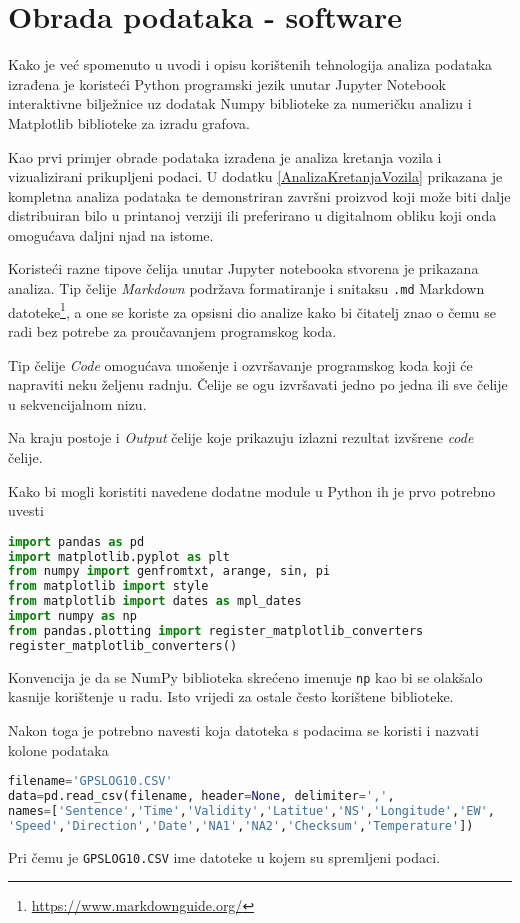 \chapter{Obrada podataka - software}\label{ch:Software}
Kako je već spomenuto u uvodi i opisu korištenih tehnologija analiza podataka izrađena je koristeći Python programski jezik unutar Jupyter Notebook interaktivne bilježnice uz dodatak Numpy biblioteke za numeričku analizu i Matplotlib biblioteke za izradu grafova.

Kao prvi primjer obrade podataka izrađena je analiza kretanja vozila i vizualizirani prikupljeni podaci.
U dodatku \ref{AnalizaKretanjaVozila} prikazana je kompletna analiza podataka te demonstriran završni proizvod koji može biti dalje distribuiran bilo u printanoj verziji ili preferirano u digitalnom obliku koji onda omogućava daljni njad na istome.

Koristeći razne tipove čelija unutar Jupyter notebooka stvorena je prikazana analiza.
Tip čelije \textit{Markdown} podržava formatiranje i snitaksu \texttt{.md} Markdown datoteke\footnote{\url{https://www.markdownguide.org/}}, a one se koriste za opsisni dio analize kako bi čitatelj znao o čemu se radi bez potrebe za proučavanjem programskog koda.

Tip čelije \textit{Code} omogućava unošenje i ozvršavanje programskog koda koji će napraviti neku željenu radnju.
Čelije se ogu izvršavati jedno po jedna ili sve čelije u sekvencijalnom nizu.

Na kraju postoje i \textit{Output} čelije koje prikazuju izlazni rezultat izvšrene \textit{code} čelije.

Kako bi mogli koristiti navedene dodatne module u Python ih je prvo potrebno uvesti
\begin{lstlisting}[language=Python]
import pandas as pd
import matplotlib.pyplot as plt
from numpy import genfromtxt, arange, sin, pi
from matplotlib import style
from matplotlib import dates as mpl_dates
import numpy as np
from pandas.plotting import register_matplotlib_converters
register_matplotlib_converters()
\end{lstlisting}

Konvencija je da se NumPy biblioteka skrećeno imenuje \texttt{np} kao bi se olakšalo kasnije korištenje u radu.
Isto vrijedi za ostale često korištene biblioteke.

Nakon toga je potrebno navesti koja datoteka s podacima se koristi i nazvati kolone podataka 
\begin{lstlisting}[language=Python]
filename='GPSLOG10.CSV'
data=pd.read_csv(filename, header=None, delimiter=',',
names=['Sentence','Time','Validity','Latitue','NS','Longitude','EW',
'Speed','Direction','Date','NA1','NA2','Checksum','Temperature'])
\end{lstlisting}
Pri čemu je \texttt{GPSLOG10.CSV} ime datoteke u kojem su spremljeni podaci.


